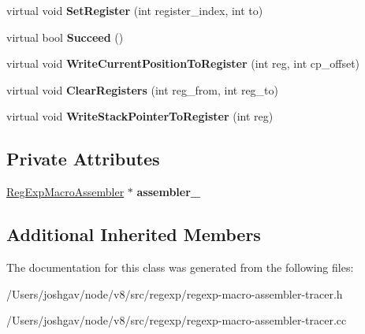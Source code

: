 \begin{DoxyCompactItemize}
\item 
virtual void {\bfseries Set\+Register} (int register\+\_\+index, int to)\hypertarget{classv8_1_1internal_1_1_reg_exp_macro_assembler_tracer_ab01c1345e811ad7b179f992b67740eee}{}\label{classv8_1_1internal_1_1_reg_exp_macro_assembler_tracer_ab01c1345e811ad7b179f992b67740eee}

\item 
virtual bool {\bfseries Succeed} ()\hypertarget{classv8_1_1internal_1_1_reg_exp_macro_assembler_tracer_a480549d020434f6c8272ba1e1ef9b574}{}\label{classv8_1_1internal_1_1_reg_exp_macro_assembler_tracer_a480549d020434f6c8272ba1e1ef9b574}

\item 
virtual void {\bfseries Write\+Current\+Position\+To\+Register} (int reg, int cp\+\_\+offset)\hypertarget{classv8_1_1internal_1_1_reg_exp_macro_assembler_tracer_a9eb13ba0f2ffd919bc5d4348c6f831a9}{}\label{classv8_1_1internal_1_1_reg_exp_macro_assembler_tracer_a9eb13ba0f2ffd919bc5d4348c6f831a9}

\item 
virtual void {\bfseries Clear\+Registers} (int reg\+\_\+from, int reg\+\_\+to)\hypertarget{classv8_1_1internal_1_1_reg_exp_macro_assembler_tracer_ad73a9a1d736bdddec6ca4a714cdbbf31}{}\label{classv8_1_1internal_1_1_reg_exp_macro_assembler_tracer_ad73a9a1d736bdddec6ca4a714cdbbf31}

\item 
virtual void {\bfseries Write\+Stack\+Pointer\+To\+Register} (int reg)\hypertarget{classv8_1_1internal_1_1_reg_exp_macro_assembler_tracer_ad1bc0faf47d26c2a3bdcd3b053525876}{}\label{classv8_1_1internal_1_1_reg_exp_macro_assembler_tracer_ad1bc0faf47d26c2a3bdcd3b053525876}

\end{DoxyCompactItemize}
\subsection*{Private Attributes}
\begin{DoxyCompactItemize}
\item 
\hyperlink{classv8_1_1internal_1_1_reg_exp_macro_assembler}{Reg\+Exp\+Macro\+Assembler} $\ast$ {\bfseries assembler\+\_\+}\hypertarget{classv8_1_1internal_1_1_reg_exp_macro_assembler_tracer_ad527bffe53f67c2c7a704bf66512a898}{}\label{classv8_1_1internal_1_1_reg_exp_macro_assembler_tracer_ad527bffe53f67c2c7a704bf66512a898}

\end{DoxyCompactItemize}
\subsection*{Additional Inherited Members}


The documentation for this class was generated from the following files\+:\begin{DoxyCompactItemize}
\item 
/\+Users/joshgav/node/v8/src/regexp/regexp-\/macro-\/assembler-\/tracer.\+h\item 
/\+Users/joshgav/node/v8/src/regexp/regexp-\/macro-\/assembler-\/tracer.\+cc\end{DoxyCompactItemize}
